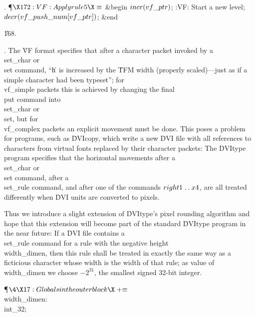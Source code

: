 . \P$\X172:VF: Apply rule 5\X\S$\6
\&{begin} $\\{incr}(\\{vf\_ptr})$;\5
:VF: Start a new level\X;\6
$\\{decr}(\\{vf\_push\_num}[\\{vf\_ptr}])$;\6
\&{end}\par
\U168.\fi

. The \.{VF} format specifies that after a character packet invoked by a
\\{set\_char} or \\{set} command, ``\|h~is increased by the \.{TFM} width
(properly scaled)---just as if a simple character had been typeset'';
for \\{vf\_simple} packets this is achieved by changing the final \\{put}
command into \\{set\_char} or \\{set}, but for \\{vf\_complex} packets an
explicit movement must be done. This poses a problem for programs,
such as \.{DVIcopy}, which write a new \.{DVI} file with all references
to characters from virtual fonts replaced by their character packets:
The \.{DVItype} program specifies that the horizontal movements after a
\\{set\_char} or \\{set} command, after a \\{set\_rule} command, and after one
of the commands $\\{right1}\to\\{x4}$, are all treated differently when \.{DVI}
units are converted to pixels.

Thus we introduce a slight extension of \.{DVItype}'s pixel rounding
algorithm and hope that this extension will become part of the standard
\.{DVItype} program in the near future: If a \.{DVI} file contains a
\\{set\_rule} command for a rule with the negative height \\{width\_dimen},
then this rule shall be treated in exactly the same way as a ficticious
character whose width is the width of that rule; as value of \\{width\_dimen}
we choose $-2^{31}$, the smallest signed 32-bit integer.

\Y\P$\4\X17:Globals in the outer block\X\mathrel{+}\S$\6
\4\\{width\_dimen}: \\{int\_32};\par
\fi

